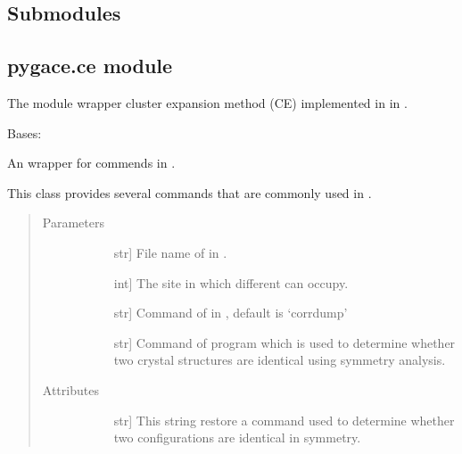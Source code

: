 \documentclass[letterpaper,10pt,english]{sphinxmanual}
\begin{document}
\subsection{Submodules}
\label{\detokenize{pygace:submodules}}

\subsection{pygace.ce module}
\label{\detokenize{pygace:module-pygace.ce}}\label{\detokenize{pygace:pygace-ce-module}}
The module wrapper cluster expansion method (CE) implemented in  in
.

\begin{fulllineitems}
\label{\detokenize{pygace:pygace.ce.CE}}
Bases: 

An wrapper for commends in .

This class provides several commands that are commonly used in .
\begin{quote}\begin{description}
\item[{Parameters}] \leavevmode\begin{description}
\item[{}] \leavevmode{[}str{]}
File name of  in .

\item[{}] \leavevmode{[}int{]}
The site in which different can occupy.

\item[{}] \leavevmode{[}str{]}
Command of  in , default is ‘corrdump’

\item[{}] \leavevmode{[}str{]}
Command of program which is used to determine whether two crystal
structures are identical using symmetry analysis.

\end{description}

\item[{Attributes}] \leavevmode\begin{description}
\item[{}] \leavevmode{[}str{]}
This string restore a command used to determine whether two
configurations are identical in symmetry.


\end{description}
\end{description}
\end{quote}
\end{fulllineitems}
\end{document}
